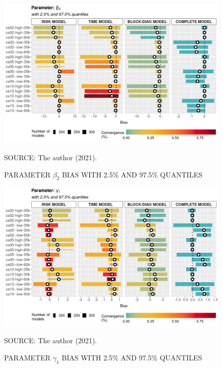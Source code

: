 \documentclass[12pt, %
               openright, %
               oneside, %
               a4paper, %
               chapter=TITLE, %
               section=TITLE, %
               brazil,
               english %
]{abntex2}
\begin{document}
\begin{apendicesenv}
\begin{figure}[H]
 \setlength{\abovecaptionskip}{.0001pt}
 \caption{PARAMETER \(\beta_{2}\) BIAS WITH 2.5\% AND 97.5\% QUANTILES}
 \vspace{0.2cm}\centering
 \includegraphics[width=\textwidth]{bias2plot-2.png}\\
 \begin{footnotesize}
  SOURCE: The author (2021).
 \end{footnotesize}
 \label{fig:biasbeta2}
\end{figure}

\begin{figure}[H]
 \setlength{\abovecaptionskip}{.0001pt}
 \caption{PARAMETER \(\gamma_{1}\) BIAS WITH 2.5\% AND 97.5\% QUANTILES}
 \vspace{0.2cm}\centering
 \includegraphics[width=\textwidth]{bias2plot-3.png}\\
 \begin{footnotesize}
  SOURCE: The author (2021).
 \end{footnotesize}
 \label{fig:biasgama1}
\end{figure}


\end{apendicesenv}
\end{document}

